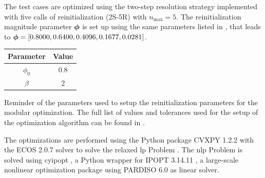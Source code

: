 The test cases are optimized using the two-step resolution strategy implemented with five calls of reinitialization (2S-5R) with $n_{\text{max}}=5$. The reinitialization magnitude parameter $\bm{\phi}$ is set up using the same parameters listed in , that leads to $\bm{\phi} = \left[ 0.8000, 0.6400, 0.4096, 0.1677, 0.0281 \right]$.
\begin{margintable}
        \small
    \centering
    \begin{tabular}{cc}
    \toprule
    \textbf{Parameter} & \textbf{Value} \\ \midrule
    $\phi_0$              & 0.8 \\
    $\beta$             & 2 \\
    \bottomrule
    \end{tabular}
    \caption{Reminder of the parameters used to setup the reinitialization parameters for the modular optimization. The full list of values and tolerances used for the setup of the optimization algorithm can be found in .}
    \label{tab:05_param}
\end{margintable}

The optimizations are performed using the Python package CVXPY 1.2.2  with the ECOS 2.0.7  solver to solve the relaxed \gls{lp} Problem . The \gls{nlp} Problem  is solved using cyipopt , a Python wrapper for IPOPT 3.14.11 , a large-scale nonlinear optimization package using PARDISO 6.0  as linear solver. 

